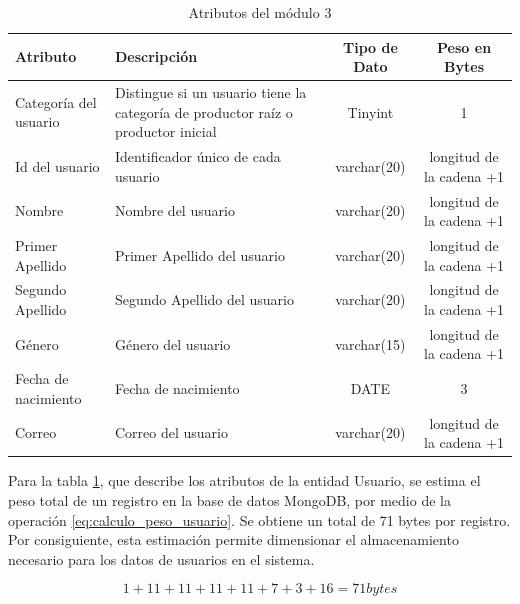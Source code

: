 \begin{table}[htbp]
    \centering
    \caption{Atributos del módulo 3} %
    \label{tab:Dato2}
    \footnotesize %

    \begin{tabular}{|>{\raggedright\arraybackslash}p{2.5cm}|>{\raggedright\arraybackslash}p{6.0cm}|c|c|}
        \hline
        \textbf{Atributo} & \textbf{Descripción} & \textbf{Tipo de Dato} & \textbf{Peso en Bytes} \\ \hline
        Categoría del usuario & Distingue si un usuario tiene la categoría de productor raíz o productor inicial & Tinyint & 1 \\ \hline
        Id del usuario & Identificador único de cada usuario & varchar(20) & longitud de la cadena +1 \\ \hline
        Nombre & Nombre del usuario & varchar(20) & longitud de la cadena +1 \\ \hline %
        Primer Apellido & Primer Apellido del usuario & varchar(20) & longitud de la cadena +1 \\ \hline
        Segundo Apellido & Segundo Apellido del usuario & varchar(20) & longitud de la cadena +1 \\ \hline
        Género & Género del usuario & varchar(15) & longitud de la cadena +1 \\ \hline
        Fecha de nacimiento & Fecha de nacimiento & DATE & 3 \\ \hline
        Correo & Correo del usuario & varchar(20) & longitud de la cadena +1 \\ \hline
    \end{tabular}
\end{table}

Para la tabla \ref{tab:Dato2}, que describe los atributos de la entidad Usuario, 
se estima el peso total de un registro en la base de datos MongoDB,
por medio de la operación \ref{eq:calculo_peso_usuario}. 
Se obtiene un total de 71 bytes por registro.
Por consiguiente, esta estimación permite dimensionar el almacenamiento necesario para los
datos de usuarios en el sistema.

\begin{equation}
1 + 11 + 11 + 11 + 11 + 7 + 3 + 16 = 71 bytes
\label{eq:calculo_peso_usuario}
\end{equation}

